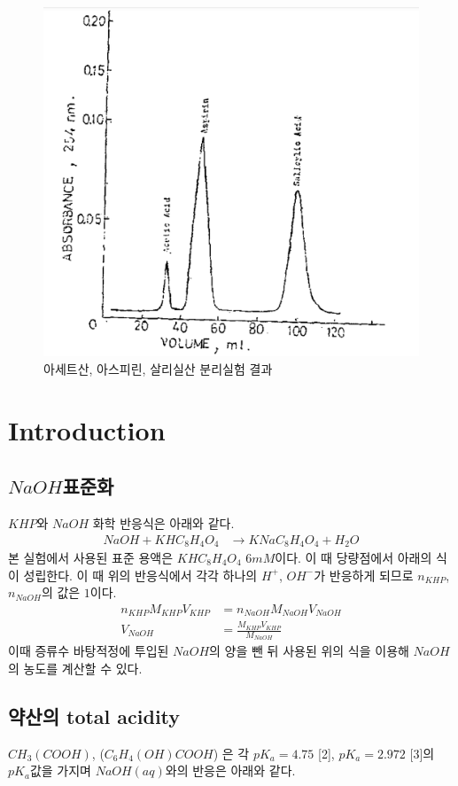 \documentclass[%
 reprint,
 amsmath,amssymb,
 aps,
]{revtex4-2}
\begin{document}
\begin{figure}[htbp]
	\includegraphics[width = 0.9\linewidth]{EXP_P.png}%
	\caption{\label{fig:EXP_P}아세트산, 아스피린, 살리실산 분리실험 결과}
\end{figure}

\section{\label{sec:level1}Introduction}
\subsection{\label{sec:level2}$NaOH$표준화}
$KHP$와 $NaOH$ 화학 반응식은 아래와 같다.
\begin{align}
	NaOH + KHC_{8}H_{4}O_{4} &\rightarrow KNaC_{8}H_{4}O_{4} + H_{2}O
\end{align}
본 실험에서 사용된 표준 용액은 $KHC_{8}H_{4}O_{4}$ $6mM$이다. 이 때 당량점에서 아래의 식이 성립한다. 이 때 위의 반응식에서 각각 하나의 $H^{+}$, $OH^{-}$가 반응하게 되므로 $n_{KHP}$, $n_{NaOH}$의 값은 $1$이다.
\begin{align}
	n_{KHP}M_{KHP}V_{KHP} &= n_{NaOH}M_{NaOH}V_{NaOH}\\
	V_{NaOH} &= \frac{M_{KHP}V_{KHP}}{M_{NaOH}}
\end{align}
이때 증류수 바탕적정에 투입된 $NaOH$의 양을 뺀 뒤 사용된 위의 식을 이용해 $NaOH$의 농도를 계산할 수 있다.


\subsection{\label{sec:level2}약산의 total acidity}
$CH_{3}(COOH)$, ($C_{6}H_{4}(OH)COOH$) 은 각 $pK_{a}=4.75$ [2], $pK_{a}=2.972$ [3]의 $pK_{a}$값을 가지며 $NaOH(aq)$와의 반응은 아래와 같다.
\end{document}
